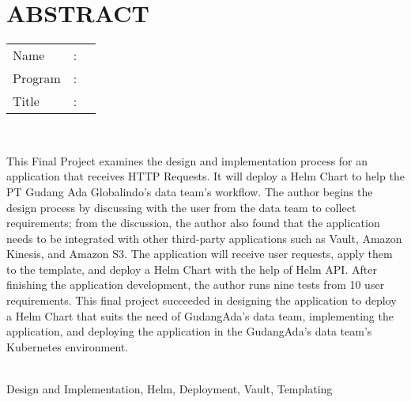 %
%
%

\chapter*{ABSTRACT}
\singlespacing

\vspace*{0.2cm}

\noindent \begin{tabular}{l l p{11.0cm}}
	Name&: & \penulis \\
	Program&: & \program \\
	Title&: & \judulInggris \\
\end{tabular} \\

\vspace*{0.5cm}

\noindent This Final Project examines the design and implementation process for an application that receives HTTP Requests. It will deploy a Helm Chart to help the PT Gudang Ada Globalindo's data team's workflow. The author begins the design process by discussing with the user from the data team to collect requirements; from the discussion, the author also found that the application needs to be integrated with other third-party applications such as Vault, Amazon Kinesis, and Amazon S3. The application will receive user requests, apply them to the template, and deploy a Helm Chart with the help of Helm API. After finishing the application development, the author runs nine tests from 10 user requirements. This final project succeeded in designing the application to deploy a Helm Chart that suits the need of GudangAda's data team, implementing the application, and deploying the application in the GudangAda's data team's Kubernetes environment.  \\

\vspace*{0.2cm}

\noindent {} \\ Design and Implementation, Helm, Deployment, Vault, Templating

\onehalfspacing
\newpage
